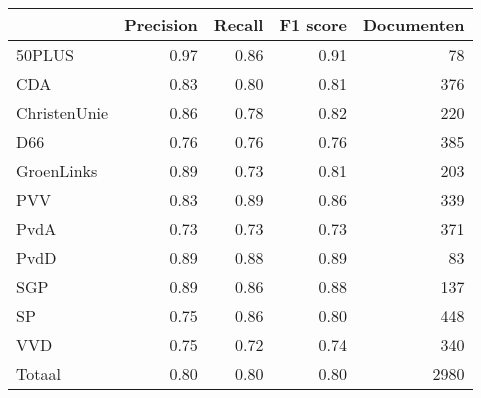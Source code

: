 \begin{tabular}{lrrrr}
\toprule
{} &  Precision &  Recall &  F1 score &  Documenten \\
\midrule
50PLUS       &       0.97 &    0.86 &      0.91 &          78 \\
CDA          &       0.83 &    0.80 &      0.81 &         376 \\
ChristenUnie &       0.86 &    0.78 &      0.82 &         220 \\
D66          &       0.76 &    0.76 &      0.76 &         385 \\
GroenLinks   &       0.89 &    0.73 &      0.81 &         203 \\
PVV          &       0.83 &    0.89 &      0.86 &         339 \\
PvdA         &       0.73 &    0.73 &      0.73 &         371 \\
PvdD         &       0.89 &    0.88 &      0.89 &          83 \\
SGP          &       0.89 &    0.86 &      0.88 &         137 \\
SP           &       0.75 &    0.86 &      0.80 &         448 \\
VVD          &       0.75 &    0.72 &      0.74 &         340 \\
Totaal       &       0.80 &    0.80 &      0.80 &        2980 \\
\bottomrule
\end{tabular}
